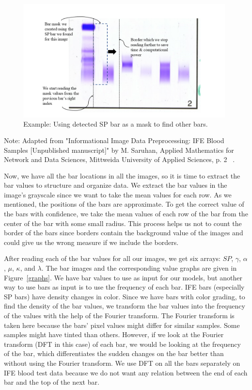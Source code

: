 \begin{figure}[H]
    \centering
    \includegraphics[width=0.98\textwidth]{images/old imgs/bar_detect.png}
    \caption{Example: Using detected SP bar as a mask to find other bars.}
    \label{bar_detect}
\end{figure}

\noindent Note: Adapted from "Informational Image Data Preprocessing: IFE Blood Samples
[Unpublished manuscript]" by M. Saruhan, Applied Mathematics for Network and Data Sciences,
Mittweida University of Applied Sciences, p. 2 ~\cite{mypap}.
\vspace{10pt}

Now, we have all the bar locations in all the images, so it is time to extract the bar values to structure and organize data. We extract the bar values in the image’s grayscale since we want to take the mean values for each row. As we mentioned, the positions of the bars are approximate. To get the correct value of the bars with confidence, we take the mean values of each row of the bar from the center of the bar with some small radius. This process helps us not to count the border of the bars since borders contain the background value of the images and could give us the wrong measure if we include the borders.

After reading each of the bar values for all our images, we get six arrays: $SP$, $\gamma$, $\alpha$, $\mu$, $\kappa$, and $\lambda$. The bar images and the corresponding value graphs are given in Figure~\ref{graphs}. We have bar values to use as input for our models, but another way to use bars as input is to use the frequency of each bar. IFE bars (especially SP bars) have density changes in color. Since we have bars with color grading, to find the density of the bar values, we transform the bar values into the frequency of the values with the help of the Fourier transform. The Fourier transform is taken here because the bars’ pixel values might differ for similar samples. Some samples might have tinted than others. However, if we look at the Fourier transform (DFT in this case) of each bar, we would be looking at the frequency of the bar, which differentiates the sudden changes on the bar better than without using the Fourier transform. We use DFT on all the bars separately on IFE blood test data because we do not want any relation between the end of each bar and the top of the next bar.

